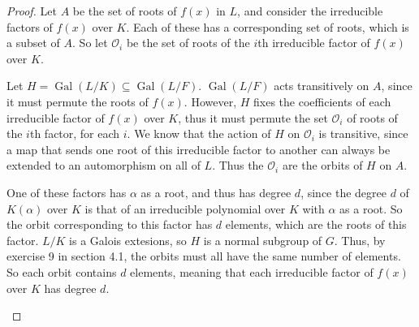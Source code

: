 \documentclass[10pt]{article}
\DeclareMathOperator*{\Gal}{Gal}
\begin{document}
\begin{enumerate}

\begin{proof}

Let $A$ be the set of roots of $f(x)$ in $L$, and consider the irreducible factors of $f(x)$ over $K$.  Each of these has a corresponding set of roots, which is a subset of $A$.  So let $\mathcal{O}_i$ be the set of roots of the $i$th irreducible factor of $f(x)$ over $K$.

Let $H = \Gal(L/K) \subseteq \Gal(L/F)$.  $\Gal(L/F)$ acts transitively on $A$, since it must permute the roots of $f(x)$.  However, $H$ fixes the coefficients of each irreducible factor of $f(x)$ over $K$, thus it must permute the set $\mathcal{O}_i$ of roots of the $i$th factor, for each $i$.  We know that the action of $H$ on $\mathcal{O}_i$ is transitive, since a map that sends one root of this irreducible factor to another can always be extended to an automorphism on all of $L$.  Thus the $\mathcal{O}_i$ are the orbits of $H$ on $A$.

One of these factors has $\alpha$ as a root, and thus has degree $d$, since the degree $d$ of $K(\alpha)$ over $K$ is that of an irreducible polynomial over $K$ with $\alpha$ as a root.  So the orbit corresponding to this factor has $d$ elements, which are the roots of this factor.  $L/K$ is a Galois extesions, so $H$ is a normal subgroup of $G$.  Thus, by exercise 9 in section 4.1, the orbits must all have the same number of elements.  So each orbit contains $d$ elements, meaning that each irreducible factor of $f(x)$ over $K$ has degree $d$.

\begin{figure}[h!]
\begin{center}
\end{center}
\end{figure}


\end{proof}
\end{enumerate}
\end{document}
